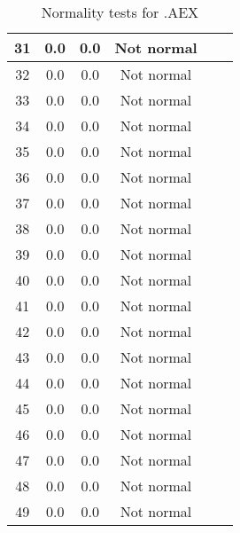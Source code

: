 \begin{table}[h]
\begin{tabular}{|c|c|c|c|c|c|}
		31 & 0.0 & 0.0 & Not normal\\\hline
		32 & 0.0 & 0.0 & Not normal\\\hline
		33 & 0.0 & 0.0 & Not normal\\\hline
		34 & 0.0 & 0.0 & Not normal\\\hline
		35 & 0.0 & 0.0 & Not normal\\\hline
		36 & 0.0 & 0.0 & Not normal\\\hline
		37 & 0.0 & 0.0 & Not normal\\\hline
		38 & 0.0 & 0.0 & Not normal\\\hline
		39 & 0.0 & 0.0 & Not normal\\\hline
		40 & 0.0 & 0.0 & Not normal\\\hline
		41 & 0.0 & 0.0 & Not normal\\\hline
		42 & 0.0 & 0.0 & Not normal\\\hline
		43 & 0.0 & 0.0 & Not normal\\\hline
		44 & 0.0 & 0.0 & Not normal\\\hline
		45 & 0.0 & 0.0 & Not normal\\\hline
		46 & 0.0 & 0.0 & Not normal\\\hline
		47 & 0.0 & 0.0 & Not normal\\\hline
		48 & 0.0 & 0.0 & Not normal\\\hline
		49 & 0.0 & 0.0 & Not normal\\\hline
	\end{tabular}
	\caption{Normality tests for .AEX}
	\label{tab:normality_tests_.AEX_}
\end{table}
